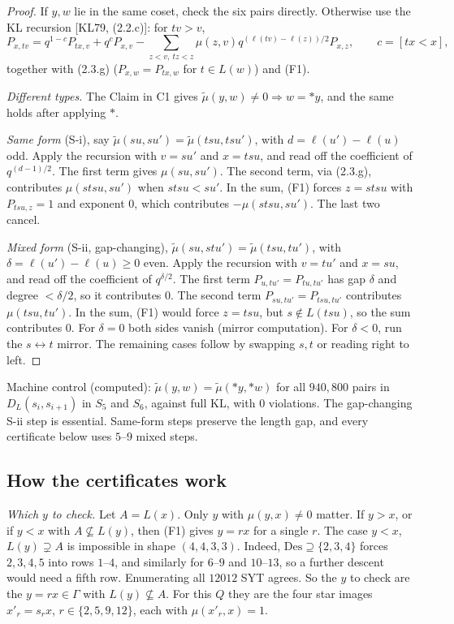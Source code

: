 \documentclass[11pt]{amsart}
\newcommand{\gr}[1]{\textsf{#1}}
\theoremstyle{definition}
\theoremstyle{remark}
\newcommand{\Des}{\mathrm{Des}}
\newcommand{\tmu}{\tilde\mu}
\begin{document}
\begin{proof}
If $y,w$ lie in the same coset, check the six pairs directly. Otherwise use the KL recursion [KL79, (2.2.c)]: for $tv>v$,
\[P_{x,tv}=q^{1-c}P_{tx,v}+q^cP_{x,v}-\textstyle\sum_{z<v,\ tz<z}\mu(z,v)q^{(\ell(tv)-\ell(z))/2}P_{x,z},\qquad c=[tx<x],\]
together with (2.3.g) ($P_{x,w}=P_{tx,w}$ for $t\in L(w)$) and (F1).

\emph{Different types.} The Claim in C1 gives $\tmu(y,w)\ne0\Rightarrow w={*y}$, and the same holds after applying $*$.

\emph{Same form} (S-i), say $\tmu(su,su')=\tmu(tsu,tsu')$, with $d=\ell(u')-\ell(u)$ odd. Apply the recursion with $v=su'$ and $x=tsu$, and read off the coefficient of $q^{(d-1)/2}$. The first term gives $\mu(su,su')$. The second term, via (2.3.g), contributes $\mu(stsu,su')$ when $stsu<su'$. In the sum, (F1) forces $z=stsu$ with $P_{tsu,z}=1$ and exponent $0$, which contributes $-\mu(stsu,su')$. The last two cancel.

\emph{Mixed form} (S-ii, gap-changing), $\tmu(su,stu')=\tmu(tsu,tu')$, with $\delta=\ell(u')-\ell(u)\ge0$ even. Apply the recursion with $v=tu'$ and $x=su$, and read off the coefficient of $q^{\delta/2}$. The first term $P_{u,tu'}=P_{tu,tu'}$ has gap $\delta$ and degree $<\delta/2$, so it contributes $0$. The second term $P_{su,tu'}=P_{tsu,tu'}$ contributes $\mu(tsu,tu')$. In the sum, (F1) would force $z=tsu$, but $s\notin L(tsu)$, so the sum contributes $0$. For $\delta=0$ both sides vanish (mirror computation). For $\delta<0$, run the $s\leftrightarrow t$ mirror. The remaining cases follow by swapping $s,t$ or reading right to left.
\end{proof}

Machine control (\gr{computed}): $\tmu(y,w)=\tmu({*y},{*w})$ for all $940{,}800$ pairs in $D_L(s_i,s_{i+1})$ in $S_5$ and $S_6$, against full KL, with $0$ violations. The gap-changing S-ii step is essential. Same-form steps preserve the length gap, and every certificate below uses $5$--$9$ mixed steps.

\subsection*{How the certificates work}
\emph{Which $y$ to check.} Let $A=L(x)$. Only $y$ with $\mu(y,x)\ne0$ matter. If $y>x$, or if $y<x$ with $A\not\subseteq L(y)$, then (F1) gives $y=rx$ for a single $r$. The case $y<x$, $L(y)\supsetneq A$ is impossible in shape $(4,4,3,3)$. Indeed, $\Des\supseteq\{2,3,4\}$ forces $2,3,4,5$ into rows $1$--$4$, and similarly for $6$--$9$ and $10$--$13$, so a further descent would need a fifth row. Enumerating all $12012$ SYT agrees. So the $y$ to check are the $y=rx\in\Gamma$ with $L(y)\not\subseteq A$. For this $Q$ they are the four star images $x'_r=s_rx$, $r\in\{2,5,9,12\}$, each with $\mu(x'_r,x)=1$.
\end{document}

